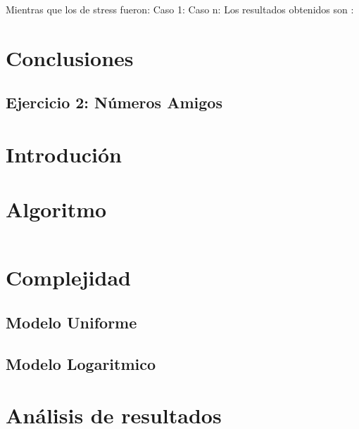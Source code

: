\documentclass[a4paper, 12pt] {article}
\begin{document}
Mientras que los de stress fueron:
Caso 1:
Caso n:
Los resultados obtenidos son :

\begin{comment}
\begin{center}

\begin{center}

\end{center}
\end{center}
\end{comment}

\section*{Conclusiones}

\newpage

\begin{center}
\section*{Ejercicio 2: N\'umeros Amigos}
\end{center}

\bigskip
\section*{Introduci\'on}

\section*{Algoritmo}

\begin{verbatim}
\end{verbatim}

\section*{Complejidad}

\subsection*{Modelo Uniforme}

\subsection*{Modelo Logaritmico}

\section*{An\'alisis de resultados}
\end{document}
